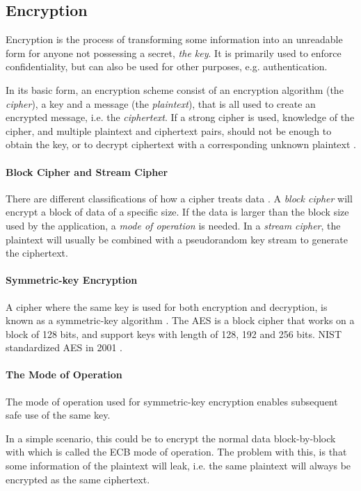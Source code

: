 \documentclass[pdftex,english,10pt,b5paper,twoside]{book}
\begin{document}
\subsection{Encryption}

Encryption is the process of transforming some information into an unreadable
form for anyone not possessing a secret, \emph{the key}. It is primarily used
to enforce confidentiality, but can also be used for other purposes, e.g.
authentication.

In its basic form, an encryption scheme consist of an encryption algorithm
(the \emph{cipher}), a key and a message (the \emph{plaintext}), that is all
used to create an encrypted message, i.e. the \emph{ciphertext}. If a strong
cipher is used, knowledge of the cipher, and multiple plaintext and ciphertext
pairs, should not be enough to obtain the key, or to decrypt ciphertext
with a corresponding unknown plaintext \cite{schneier}.

\paragraph{Block Cipher and Stream Cipher} There are different classifications
of how a cipher treats data \cite[p. 32]{stallings}. A \emph{block cipher} will
encrypt a block of data of a specific size. If the data is larger than the
block size used by the application, a \emph{mode of operation} is needed. In a
\emph{stream cipher}, the plaintext will usually be combined with a pseudorandom key
stream to generate the ciphertext.

\paragraph{Symmetric-key Encryption} A cipher where the same key is used for
both encryption and decryption, is known as a symmetric-key algorithm \cite[p.
32]{stallings}. The \ac{AES} is a block cipher that works on a block of 128
bits, and support keys with length of 128, 192 and 256 bits. \ac{NIST}
standardized \ac{AES} in 2001 \cite{AES-FIPS}.

\paragraph{The Mode of Operation} The mode of operation used for 
symmetric-key encryption enables subsequent safe use of the same key.

In a simple scenario, this could be to encrypt the normal data block-by-block
with which is called the \ac{ECB} mode of operation. The problem with
this, is that some information of the plaintext will leak, i.e. the same
plaintext will always be encrypted as the same ciphertext.
\end{document}
